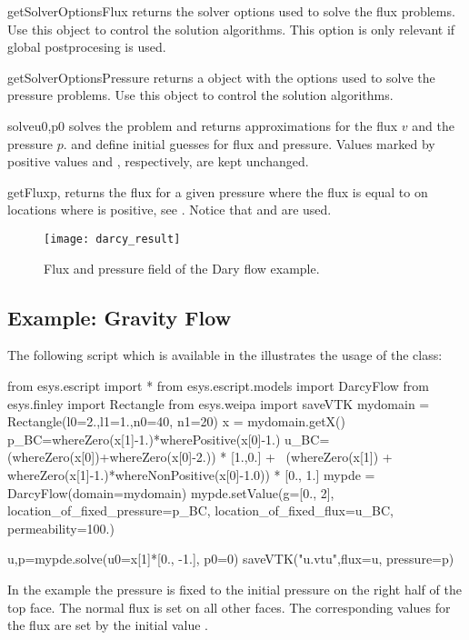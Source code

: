 \begin{methoddesc}[DarcyFlow]{getSolverOptionsFlux}{}
returns the solver options used to solve the flux problems.
Use this \SolverOptions object to control the solution algorithms.
This option is only relevant if global postprocesing is used.
\end{methoddesc}

\begin{methoddesc}[DarcyFlow]{getSolverOptionsPressure}{}
returns a \SolverOptions object with the options used to solve the pressure
problems.
Use this object to control the solution algorithms.
\end{methoddesc}

\begin{methoddesc}[DarcyFlow]{solve}{u0,p0}
solves the problem and returns approximations for the flux $v$ and the pressure $p$.
 and  define initial guesses for flux and pressure.
Values marked by positive values  and
, respectively, are kept unchanged.
\end{methoddesc}

\begin{methoddesc}[DarcyFlow]{getFlux}{p, }
returns the flux for a given pressure  where the flux is equal to 
on locations where  is positive,  see .
Notice that  and  are used.
\end{methoddesc}

\begin{figure}
\centerline{\texttt{[image: darcy\_result]}}
\caption{Flux and pressure field of the Dary flow example.}
\label{DARCY FIG 1}
\end{figure}

\subsection{Example: Gravity Flow}
The following script 
which is available in the \ExampleDirectory illustrates the usage of the
 class:
\begin{python}
   from esys.escript import *
   from esys.escript.models import DarcyFlow
   from esys.finley import Rectangle
   from esys.weipa import saveVTK
   mydomain = Rectangle(l0=2.,l1=1.,n0=40, n1=20)
   x = mydomain.getX()
   p_BC=whereZero(x[1]-1.)*wherePositive(x[0]-1.)
   u_BC=(whereZero(x[0])+whereZero(x[0]-2.)) * [1.,0.] + \
     (whereZero(x[1]) + whereZero(x[1]-1.)*whereNonPositive(x[0]-1.0)) * [0., 1.]
   mypde = DarcyFlow(domain=mydomain)
   mypde.setValue(g=[0., 2],
                  location_of_fixed_pressure=p_BC,
                  location_of_fixed_flux=u_BC,
                  permeability=100.)

   u,p=mypde.solve(u0=x[1]*[0., -1.], p0=0)
   saveVTK("u.vtu",flux=u, pressure=p)
\end{python}
In the example the pressure is fixed to the initial pressure  on the right half of the top face.
The normal flux is set on all other faces. The corresponding values for the flux are set by the initial value
\var{u0}.   
